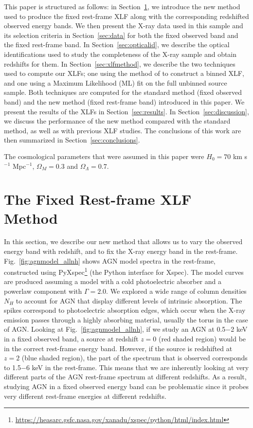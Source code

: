\documentclass[fleqn,usenatbib]{mnras}
\begin{document}
This paper is structured as follows: 
in Section~\ref{sec:redshiftmethod}, we introduce the new method used to produce the fixed rest-frame XLF along with the corresponding redshifted observed energy bands.
We then present the X-ray data used in this sample and its selection criteria in Section~\ref{sec:data} for both the fixed observed band and the fixed rest-frame band. 
In Section~\ref{sec:opticalid}, we describe the optical identifications used to study the completeness of the X-ray sample and obtain redshifts for them. 
In Section~\ref{sec:xlfmethod}, we describe the two techniques used to compute our XLFs; one using the method of \cite{page2000improved} to construct a binned XLF, and one using a Maximum Likelihood (ML) fit on the full unbinned source sample. 
Both techniques are computed for the standard method (fixed observed band) and the new method (fixed rest-frame band) introduced in this paper. 
We present the results of the XLFs in Section~\ref{sec:results}.
In Section~\ref{sec:discussion}, we discuss the performance of the new method compared with the standard method, as well as with previous XLF studies. 
The conclusions of this work are then summarized in Section~\ref{sec:conclusions}.

The cosmological parameters that were assumed in this paper were $H_{0} = 70$ km s$^{-1}$ Mpc$^{-1}$, $\Omega_{M} = 0.3$ and $\Omega_{\Lambda} = 0.7$.



\section{The Fixed Rest-frame XLF Method}\label{sec:redshiftmethod}
 	
In this section, we describe our new method that allows us to vary the observed energy band with redshift, and to fix the X-ray energy band in the rest-frame.
Fig.~\ref{fig:agnmodel_allnh} shows AGN model spectra in the rest-frame, constructed using PyXspec\footnote{\protect\url{https://heasarc.gsfc.nasa.gov/xanadu/xspec/python/html/index.html}} (the Python interface for Xspec).
The model curves are produced assuming a model with a cold photoelectric absorber and a powerlaw component with $\Gamma = 2.0$. 
We explored a wide range of column densities $N_{H}$ to account for AGN that display different levels of intrinsic absorption.
The spikes correspond to photoelectric absorption edges, which occur when the X-ray emission passes through a highly absorbing material, usually the torus in the case of AGN.
Looking at Fig.~\ref{fig:agnmodel_allnh}, if we study an AGN at 0.5$-$2 keV in a fixed observed band, a source at redshift $z=0$ (red shaded region) would be in the correct rest-frame energy band. 
However, if the source is redshifted at $z=2$ (blue shaded region), the part of the spectrum that is observed corresponds to 1.5$-$6 keV in the rest-frame. 
This means that we are inherently looking at very different parts of the AGN rest-frame spectrum at different redshifts. 
As a result, studying AGN in a fixed observed energy band can be problematic since it probes very different rest-frame energies at different redshifts.
\end{document}
